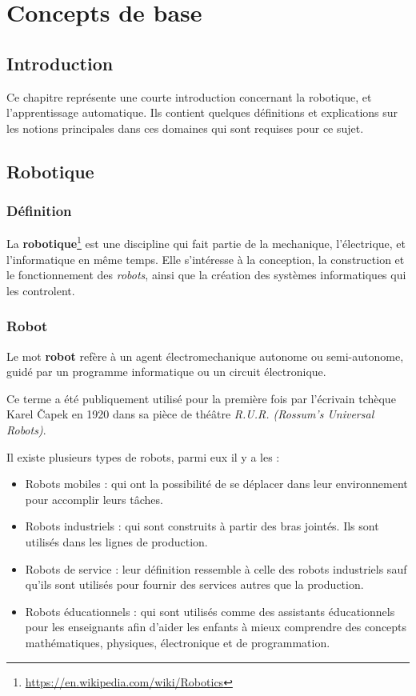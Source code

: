 \chapter{Concepts de base}

\section{Introduction}

Ce chapitre représente une courte introduction concernant la robotique, et
l'apprentissage automatique. Ils contient quelques définitions et explications
sur les notions principales dans ces domaines qui sont requises pour ce sujet.

\section{Robotique}

\subsection{Définition}

La \textbf{robotique}\footnote{\url{https://en.wikipedia.com/wiki/Robotics}}
est une discipline qui fait partie de la mechanique,
l'électrique, et l'informatique en même temps. Elle s'intéresse à la conception,
la construction et le fonctionnement des \emph{robots}, ainsi que la création des
systèmes informatiques qui les controlent.

\subsection{Robot}

Le mot \textbf{robot} refère à un agent électromechanique autonome ou
semi-autonome, guidé par un programme informatique ou un circuit électronique.

Ce terme a été publiquement utilisé pour la première fois par l'écrivain tchèque
Karel Čapek en 1920 dans sa pièce de théâtre \emph{R.U.R.
(Rossum's Universal Robots)}.

Il existe plusieurs types de robots, parmi eux il y a les :

\begin{itemize}
  \item Robots mobiles : qui ont la possibilité de se déplacer dans leur
  environnement pour accomplir leurs tâches.
  \item Robots industriels : qui sont construits à partir des bras jointés. Ils
  sont utilisés dans les lignes de production.
  \item Robots de service : leur définition ressemble à celle des robots
  industriels sauf qu'ils sont utilisés pour fournir des services autres que
  la production.
  \item Robots éducationnels : qui sont utilisés comme des assistants
  éducationnels pour les enseignants afin d'aider les enfants à mieux comprendre
  des concepts mathématiques, physiques, électronique et de programmation.
\end{itemize}

